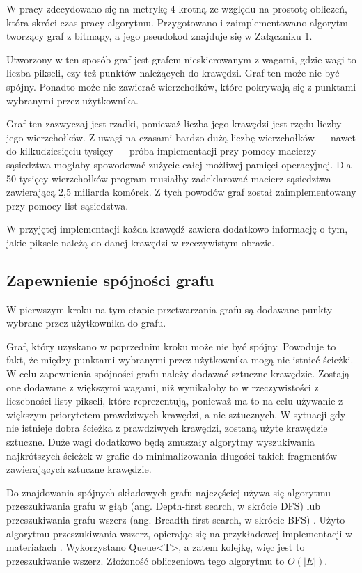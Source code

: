 \documentclass[a4paper,11pt,twoside,openright]{report}
\theoremstyle{definition}
\begin{document}
\bigskip

W pracy zdecydowano się na metrykę 4-krotną ze względu na prostotę obliczeń,
która skróci czas pracy algorytmu. Przygotowano
i zaimplementowano algorytm tworzący graf z bitmapy, a jego pseudokod znajduje
się w Załączniku 1. %

Utworzony w ten sposób graf jest grafem nieskierowanym z wagami, gdzie wagi to
liczba pikseli, czy też punktów należących do krawędzi. Graf ten może nie być
spójny. Ponadto może nie zawierać wierzchołków, które pokrywają się z punktami
wybranymi przez użytkownika.

Graf ten zazwyczaj jest rzadki, ponieważ liczba jego krawędzi jest rzędu liczby
jego wierzchołków.  Z uwagi na czasami bardzo dużą liczbę wierzchołków --- nawet
do kilkudziesięciu tysięcy --- próba implementacji przy pomocy macierzy sąsiedztwa
mogłaby spowodować zużycie całej możliwej pamięci operacyjnej. Dla 50 tysięcy
wierzchołków program musiałby zadeklarować macierz sąsiedztwa zawierającą 2,5
miliarda komórek. Z tych powodów graf został zaimplementowany przy pomocy list sąsiedztwa.

W przyjętej implementacji każda krawędź zawiera dodatkowo informację o tym, jakie
piksele należą do danej krawędzi w rzeczywistym obrazie.

\subsection {Zapewnienie spójności grafu}

W pierwszym kroku na tym etapie przetwarzania grafu są dodawane punkty wybrane
przez użytkownika do grafu.

Graf, który uzyskano w poprzednim kroku może nie być spójny. Powoduje to fakt,
że między punktami wybranymi przez użytkownika mogą nie istnieć ścieżki. W celu
zapewnienia spójności grafu należy dodawać sztuczne krawędzie. Zostają one dodawane
z większymi wagami, niż wynikałoby to w rzeczywistości z liczebności listy pikseli,
które reprezentują, ponieważ ma to na celu używanie z większym priorytetem prawdziwych
krawędzi, a nie sztucznych. W sytuacji gdy nie istnieje dobra ścieżka z prawdziwych
krawędzi, zostaną użyte krawędzie sztuczne. Duże wagi dodatkowo będą zmuszały
algorytmy wyszukiwania najkrótszych ścieżek w grafie do minimalizowania długości
takich fragmentów zawierających sztuczne krawędzie.

Do znajdowania spójnych składowych grafu najczęściej używa się algorytmu
przeszukiwania grafu w głąb (ang. Depth-first search, w skrócie DFS) lub
przeszukiwania grafu wszerz (ang. Breadth-first search, w skrócie BFS)
\cite{Algorytmy Sedgewick}. Użyto algorytmu przeszukiwania wszerz, opierając się
na przykładowej implementacji w materiałach \cite{AiSD2}. Wykorzystano Queue<T>,
a zatem kolejkę, więc jest to przeszukiwanie wszerz. Złożoność obliczeniowa tego
algorytmu to $O(|E|)$.
\end{document}

